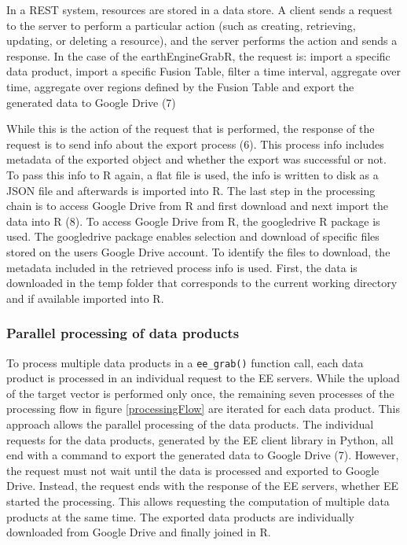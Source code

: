 In a REST system, resources are stored in a data store. A client sends a request to the server to perform a particular action (such as creating, retrieving, updating, or deleting a resource), and the server performs the action and sends a response. In the case of the earthEngineGrabR, the request is: import a specific data product, import a specific Fusion Table, filter a time interval, aggregate over time, aggregate over regions defined by the Fusion Table and export the generated data to Google Drive (7)

While this is the action of the request that is performed, the response of the request is to send info about the export process (6). This process info includes metadata of the exported object and whether the export was successful or not. To pass this info to R again, a flat file is used, the info is written to disk as a JSON file and afterwards is imported into R. The last step in the processing chain is to access Google Drive from R and first download and next import the data into R (8). To access Google Drive from R, the googledrive R package is used. The googledrive package enables selection and download of specific files stored on the users Google Drive account. To identify the files to download, the metadata included in the retrieved process info is used. First, the data is downloaded in the temp folder that corresponds to the current working directory and if available imported into R.

\subsubsection{Parallel processing of data products}


To process multiple data products in a \texttt{ee\_grab()} function call, each data product is processed in an individual request to the EE servers. While the upload of the target vector is performed only once, the remaining seven processes of the processing flow in figure \ref{processingFlow} are iterated for each data product. This approach allows the parallel processing of the data products. The individual requests for the data products, generated by the EE client library in Python, all end with a command to export the generated data to Google Drive (7). However, the request must not wait until the data is processed and exported to Google Drive. Instead, the request ends with the response of the EE servers, whether EE started the processing. 
This allows requesting the computation of multiple data products at the same time. The exported data products are individually downloaded from Google Drive and finally joined in R.


